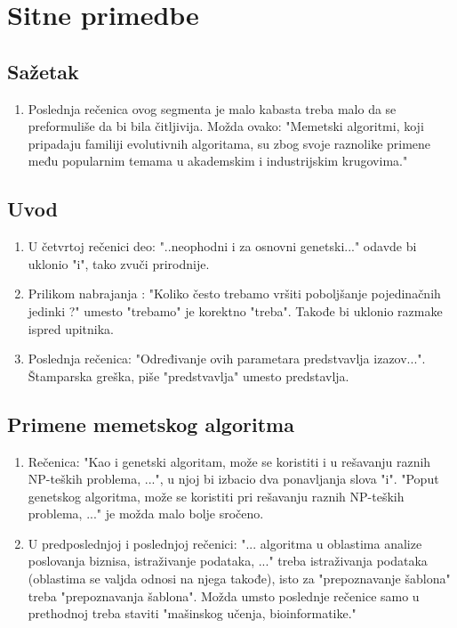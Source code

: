 \documentclass[a4paper]{report}
\begin{document}
\section{Sitne primedbe}

\subsection{Sažetak}
\begin{enumerate}
  \item Poslednja rečenica ovog segmenta je malo kabasta treba malo da se preformuliše da bi bila čitljivija. Možda ovako: "Memetski algoritmi, koji pripadaju familiji evolutivnih algoritama, su zbog svoje raznolike primene među popularnim temama u akademskim i industrijskim krugovima."
\end{enumerate}

\subsection{Uvod}
\begin{enumerate}
  \item U četvrtoj rečenici deo:  "..neophodni i za osnovni genetski..."  odavde bi uklonio "i", tako zvuči prirodnije.
  \item Prilikom nabrajanja : "Koliko često trebamo vršiti poboljšanje pojedinačnih jedinki ?" umesto "trebamo" je korektno "treba". Takođe bi uklonio razmake ispred upitnika.
  \item Poslednja rečenica: "Određivanje ovih parametara predstvavlja izazov...". Štamparska greška, piše "predstvavlja" umesto predstavlja.
\end{enumerate}

\subsection{Primene memetskog algoritma}

\begin{enumerate}
  \item Rečenica: "Kao i genetski algoritam, može se koristiti i u rešavanju raznih
NP-teških problema, ...", u njoj bi izbacio dva ponavljanja slova "i". "Poput genetskog algoritma, može se koristiti pri rešavanju raznih NP-teških problema, ..." je možda malo bolje sročeno.
  \item U predposlednjoj i poslednjoj rečenici: "... algoritma u oblastima analize poslovanja biznisa, istraživanje podataka, ..." treba istraživanja podataka (oblastima se valjda odnosi na njega takođe), isto za "prepoznavanje šablona" treba "prepoznavanja šablona". Možda umsto poslednje rečenice samo u prethodnoj treba staviti "mašinskog učenja, bioinformatike."
\end{enumerate}
\end{document}

